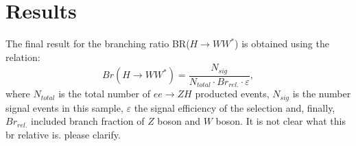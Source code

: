\documentclass[11pt,a4paper]{cepcnote}
\begin{document}
%
%



%
%


%
%
\section{Results}
The final result for the branching ratio BR($H\rightarrow WW^*$) is 
obtained using the relation: 
\begin{equation*}
Br(H\rightarrow WW^*) = \frac{N_{sig}}{N_{total} \cdot Br_{rel.} \cdot \varepsilon},
\end{equation*}
where $N_{total}$ is the total number of $ee\to ZH$ producted events,
$N_{sig}$ is the number signal events in this sample, $\varepsilon$ the
signal efficiency of the selection and, finally, $Br_{rel.}$ included branch fraction of $Z$ boson and $W$ boson.
{\color{red}It is not clear what this br relative is. please clarify}.
\end{document}
